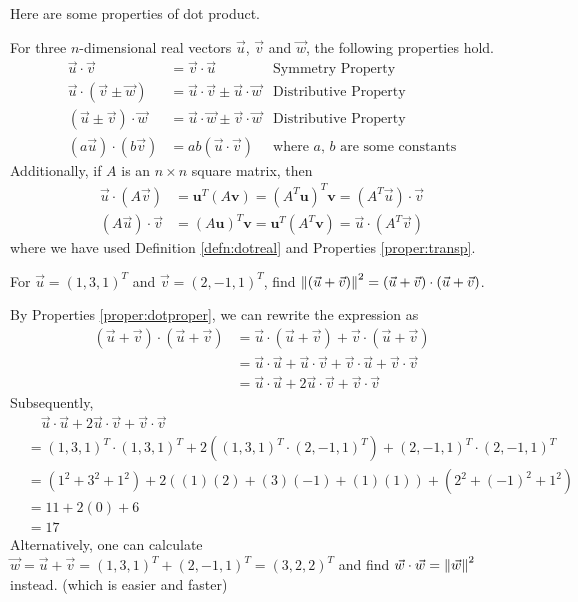 Here are some properties of dot product.
\begin{proper}
\label{proper:dotproper}
For three $n$-dimensional real vectors $\vec{u}$, $\vec{v}$ and $\vec{w}$, the following properties hold.
\begin{align*}
\vec{u} \cdot \vec{v} &= \vec{v} \cdot \vec{u} &\text{Symmetry Property} \\
\vec{u} \cdot (\vec{v} \pm \vec{w}) &= \vec{u} \cdot \vec{v} \pm \vec{u} \cdot \vec{w} &\text{Distributive Property} \\
(\vec{u} \pm \vec{v}) \cdot \vec{w} &= \vec{u} \cdot \vec{w} \pm \vec{v} \cdot \vec{w} &\text{Distributive Property} \\
(a\vec{u}) \cdot (b\vec{v}) &= ab(\vec{u} \cdot \vec{v}) &\text{where $a$, $b$ are some constants}
\end{align*}
Additionally, if $A$ is an $n \times n$ square matrix, then
\begin{align*}
\vec{u} \cdot (A\vec{v}) &= \textbf{u}^T(A\textbf{v}) = (A^T\textbf{u})^T\textbf{v} = (A^T\vec{u}) \cdot \vec{v} \\
(A\vec{u}) \cdot \vec{v} &= (A\textbf{u})^T\textbf{v} = \textbf{u}^T(A^T\textbf{v}) = \vec{u} \cdot (A^T\vec{v})
\end{align*}
where we have used Definition \ref{defn:dotreal} and Properties \ref{proper:transp}.
\end{proper}
\begin{exmp}
For $\vec{u} = (1,3,1)^T$ and $\vec{v} = (2,-1,1)^T$, find $\norm{(\vec{u} + \vec{v})}^2 = (\vec{u} + \vec{v}) \cdot (\vec{u} + \vec{v})$.
\end{exmp}
\begin{solution}
By Properties \ref{proper:dotproper}, we can rewrite the expression as
\begin{align*}
(\vec{u} + \vec{v}) \cdot (\vec{u} + \vec{v}) &= \vec{u} \cdot (\vec{u} + \vec{v}) + \vec{v} \cdot (\vec{u} + \vec{v}) \\
&= \vec{u} \cdot \vec{u} + \vec{u} \cdot \vec{v} + \vec{v} \cdot \vec{u} + \vec{v} \cdot \vec{v} \\
&= \vec{u} \cdot \vec{u} + 2 \vec{u} \cdot \vec{v} + \vec{v} \cdot \vec{v}
\end{align*}
Subsequently,
\begin{align*}
&\quad \vec{u} \cdot \vec{u} + 2 \vec{u} \cdot \vec{v} + \vec{v} \cdot \vec{v} \\
&= (1,3,1)^T \cdot (1,3,1)^T + 2((1,3,1)^T \cdot (2,-1,1)^T) + (2,-1,1)^T \cdot (2,-1,1)^T \\
&= (1^2 + 3^2 + 1^2) + 2((1)(2)+(3)(-1)+(1)(1)) + (2^2 + (-1)^2 + 1^2) \\
&= 11 + 2(0) + 6 \\
&= 17
\end{align*}
Alternatively, one can calculate $\vec{w} = \vec{u} + \vec{v} = (1,3,1)^T + (2,-1,1)^T = (3,2,2)^T$ and find $\vec{w} \cdot \vec{w} = \norm{\vec{w}}^2$ instead. (which is easier and faster)
\end{solution}
